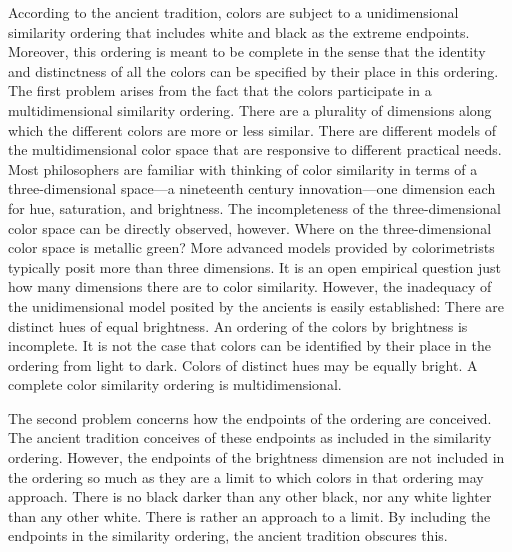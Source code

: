 According to the ancient tradition, colors are subject to a unidimensional similarity ordering that includes white and black as the extreme endpoints. Moreover, this ordering is meant to be complete in the sense that the identity and distinctness of all the colors can be specified by their place in this ordering. The first problem arises from the fact that the colors participate in a multidimensional similarity ordering. There are a plurality of dimensions along which the different colors are more or less similar. There are different models of the multidimensional color space that are responsive to different practical needs. Most philosophers are familiar with thinking of color similarity in terms of a three-dimensional space---a nineteenth century innovation---one dimension each for hue, saturation, and brightness. The incompleteness of the three-dimensional color space can be directly observed, however. Where on the three-dimensional color space is metallic green? More advanced models provided by colorimetrists typically posit more than three dimensions. It is an open empirical question just how many dimensions there are to color similarity. However, the inadequacy of the unidimensional model posited by the ancients is easily established: There are distinct hues of equal brightness. An ordering of the colors by brightness is incomplete. It is not the case that colors can be identified by their place in the ordering from light to dark. Colors of distinct hues may be equally bright. A complete color similarity ordering is multidimensional.

The second problem concerns how the endpoints of the ordering are conceived. The ancient tradition conceives of these endpoints as included in the similarity ordering. However, the endpoints of the brightness dimension are not included in the ordering so much as they are a limit to which colors in that ordering may approach. There is no black darker than any other black, nor any white lighter than any other white. There is rather an approach to a limit. By including the endpoints in the similarity ordering, the ancient tradition obscures this.

